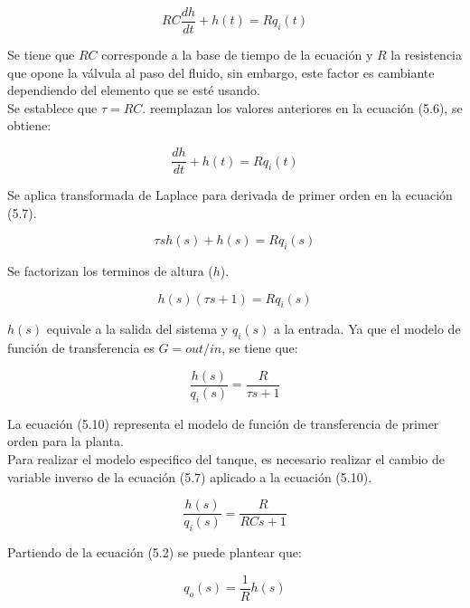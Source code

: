 \documentclass[a4paper,12pt,twoside]{proyectotanquesecci}
\begin{document}
\begin{equation}
RC\frac {dh}{dt}+h\left( t\right) =Rq_{i}\left( t\right)
\end{equation}

Se tiene que $RC$ corresponde a la base de tiempo de la ecuación y $R$ la resistencia que opone la válvula al paso del fluido, sin embargo, este factor es cambiante dependiendo del elemento que se esté usando. \\

Se establece que $\tau =RC$. reemplazan los valores anteriores en la ecuación (5.6), se obtiene:

\begin{equation}
\frac {dh}{dt}+h\left( t\right) =Rq_{i}\left( t\right)
\end{equation}

Se aplica transformada de Laplace para derivada de primer orden en la ecuación (5.7).

\begin{equation}
\tau sh\left( s\right) +h\left( s\right) =Rq_{i}\left( s\right)
\end{equation}

Se factorizan los terminos de altura ($h$).

\begin{equation}
h\left( s\right) \left( \tau s+1\right) =Rq_{i}\left( s\right)
\end{equation}

$h(s)$ equivale a la salida del sistema y $q_{i}(s)$ a la entrada. Ya que el modelo de función de transferencia es $G=out/in$, se tiene que:

\begin{equation}
\frac {h\left( s\right) }{q_{i}\left( s\right) }=\frac {R}{\tau s+1}
\end{equation}

La ecuación (5.10) representa el modelo de función de transferencia de primer orden para la planta. \\

Para realizar el modelo especifico del tanque, es necesario realizar el cambio de variable inverso de la ecuación (5.7) aplicado a la ecuación (5.10).

\begin{equation}
\frac {h\left( s\right) }{q_{i}\left( s\right) }=\frac {R}{RCs+1}
\end{equation}

Partiendo de la ecuación (5.2) se puede plantear que:

\begin{equation}
q_{o}(s)=\frac{1}{R}h(s)
\end{equation}
\end{document}

